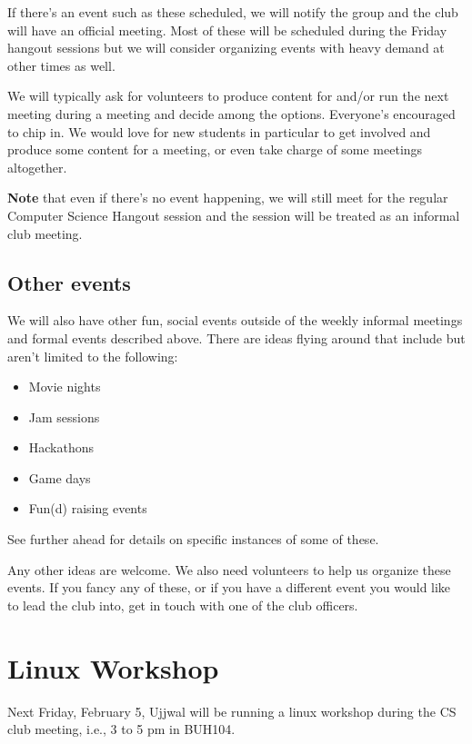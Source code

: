 If there's an event such as these scheduled, we will notify the group and the
club will have an official meeting. Most of these will be scheduled during the
Friday hangout sessions but we will consider organizing events with heavy
demand at other times as well.

We will typically ask for volunteers to produce content for and/or run the next
meeting during a meeting and decide among the options. Everyone's encouraged to
chip in. We would love for new students in particular to get involved and
produce some content for a meeting, or even take charge of some meetings
altogether.

\textbf{Note} that even if there's no event happening, we will still meet for the
regular Computer Science Hangout session and the session will be treated as an
informal club meeting.

\newpage

\subsection{Other events}
\label{sec-3-4}

We will also have other fun, social events outside of the weekly informal
meetings and formal events described above. There are ideas flying around that
include but aren't limited to the following:
\begin{itemize}
\item Movie nights
\item Jam sessions
\item Hackathons
\item Game days
\item Fun(d) raising events
\end{itemize}

See further ahead for details on specific instances of some of these.

Any other ideas are welcome. We also need volunteers to help us organize these
events. If you fancy any of these, or if you have a different event you would
like to lead the club into, get in touch with one of the club officers.


\newpage


\section{Linux Workshop}
\label{sec-4}

Next Friday, February 5, Ujjwal will be running a linux workshop during the CS club
meeting, i.e., 3 to 5 pm in BUH104.

